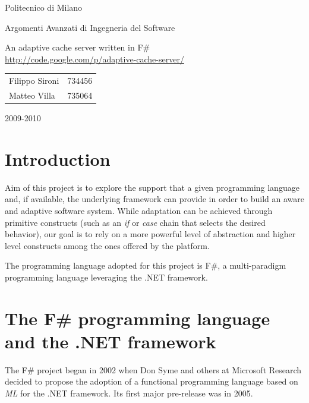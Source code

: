 \documentclass[11pt,a4paper]{article}
\begin{document}
\thispagestyle{empty}

\begin{center}
{\huge Politecnico di Milano}
\end{center}

\begin{center}
{\huge Argomenti Avanzati di Ingegneria del Software}
\end{center}

\vskip 8cm

\begin{center}
{\huge An adaptive cache server written in F\#}\\
\url{http://code.google.com/p/adaptive-cache-server/}
\end{center}

\vskip 2cm

\begin{center}
\begin{tabular}{ll}
{\large Filippo Sironi} & {\large 734456}\\
{\large Matteo Villa} & {\large 735064}\\
\end{tabular}
\end{center}

\vskip 2cm

\begin{center}
{\large 2009-2010}
\end{center}

\newpage

\section{Introduction}
\label{section:introduction}
Aim of this project is to explore the support that a given programming language and, if available, the underlying framework can provide in order to build an aware and adaptive software system.
While adaptation can be achieved through primitive constructs (such as an \textit{if} or \textit{case} chain that selects the desired behavior), our goal is to rely on a more powerful level of abstraction and higher level constructs among the ones offered by the platform.

The programming language adopted for this project is F\#, a multi-paradigm programming language leveraging the .NET framework.

\section{The F\# programming language and the .NET framework}
\label{section:platform}
The F\# project began in 2002 when Don Syme and others at Microsoft Research decided to propose the adoption of a functional programming language based on \textit{ML} for the .NET framework. Its first major pre-release was in 2005.
\end{document}
